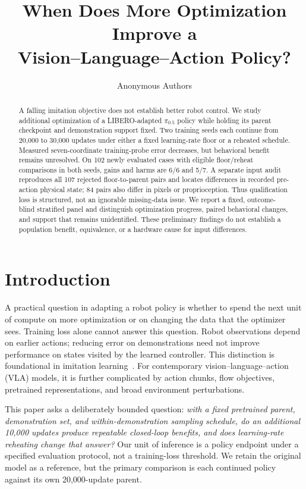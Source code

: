\documentclass[conference]{IEEEtran}
\begin{document}
\title{When Does More Optimization Improve a\\Vision--Language--Action Policy?}
\author{Anonymous Authors}
\maketitle
\begin{abstract}
A falling imitation objective does not establish better robot control. We study additional optimization of a LIBERO-adapted $\pi_{0.5}$ policy while holding its parent checkpoint and demonstration support fixed. Two training seeds each continue from 20,000 to 30,000 updates under either a fixed learning-rate floor or a reheated schedule. Measured seven-coordinate training-probe error decreases, but behavioral benefit remains unresolved. On 102 newly evaluated cases with eligible floor/reheat comparisons in both seeds, gains and harms are 6/6 and 5/7. A separate input audit reproduces all 107 rejected floor-to-parent pairs and locates differences in recorded pre-action physical state; 84 pairs also differ in pixels or proprioception. Thus qualification loss is structured, not an ignorable missing-data issue. We report a fixed, outcome-blind stratified panel and distinguish optimization progress, paired behavioral changes, and support that remains unidentified. These preliminary findings do not establish a population benefit, equivalence, or a hardware cause for input differences.
\end{abstract}

\section{Introduction}
A practical question in adapting a robot policy is whether to spend the next unit of compute on more optimization or on changing the data that the optimizer sees. Training loss alone cannot answer this question. Robot observations depend on earlier actions; reducing error on demonstrations need not improve performance on states visited by the learned controller. This distinction is foundational in imitation learning~\cite{ross}. For contemporary vision--language--action (VLA) models, it is further complicated by action chunks, flow objectives, pretrained representations, and broad environment perturbations.

This paper asks a deliberately bounded question: \emph{with a fixed pretrained parent, demonstration set, and within-demonstration sampling schedule, do an additional 10,000 updates produce repeatable closed-loop benefits, and does learning-rate reheating change that answer?} Our unit of inference is a policy endpoint under a specified evaluation protocol, not a training-loss threshold. We retain the original model as a reference, but the primary comparison is each continued policy against its own 20,000-update parent.
\end{document}
